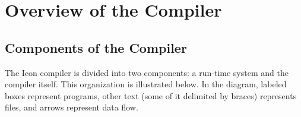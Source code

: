 \chapter{Overview of the Compiler}

\section{Components of the Compiler}

The Icon compiler is divided into two components: a run-time system
and the compiler itself. This organization is illustrated below. In
the diagram, labeled boxes represent programs, other text (some of it
delimited by braces) represents files, and arrows represent data flow.


